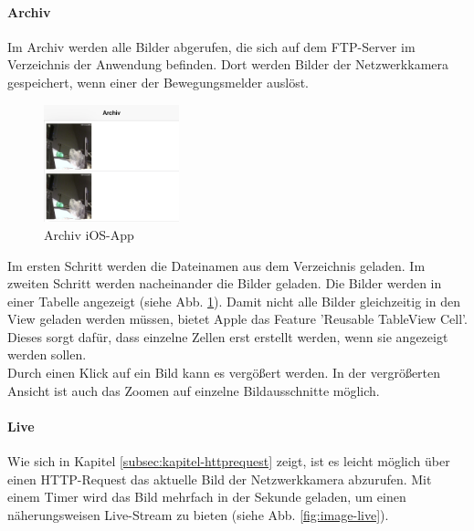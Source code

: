 \clearpage
\pagebreak %


\paragraph{Archiv} 
Im Archiv werden alle Bilder abgerufen, die sich auf dem FTP-Server im Verzeichnis der Anwendung befinden.
Dort werden Bilder der Netzwerkkamera gespeichert, wenn einer der Bewegungsmelder auslöst. \\
\begin{figure}
	\vspace{-20pt}
	\begin{center}
		\includegraphics[width=0.35\textwidth]{./data/archiv.png}
	\end{center}
	\vspace{-20pt}
	\caption{\label{fig:image-archiv}Archiv iOS-App}
	\vspace{-10pt}
\end{figure} 

Im ersten Schritt werden die Dateinamen aus dem Verzeichnis geladen. Im zweiten Schritt werden nacheinander die Bilder geladen. Die Bilder werden in einer Tabelle angezeigt (siehe Abb. \ref{fig:image-archiv}). Damit nicht alle Bilder gleichzeitig in den View geladen werden müssen, bietet Apple das Feature 'Reusable TableView Cell'.  Dieses sorgt dafür, dass einzelne Zellen erst erstellt werden, wenn sie angezeigt werden sollen. \\
Durch einen Klick auf ein Bild kann es vergößert werden. In der vergrößerten Ansicht ist auch das Zoomen auf einzelne Bildausschnitte möglich.


\paragraph{Live} Wie sich in Kapitel \ref{subsec:kapitel-httprequest} zeigt, ist es leicht möglich über einen HTTP-Request das aktuelle Bild der Netzwerkkamera abzurufen. Mit einem Timer wird das Bild mehrfach in der Sekunde geladen, um einen näherungsweisen Live-Stream zu bieten (siehe Abb. \ref{fig:image-live}). 


